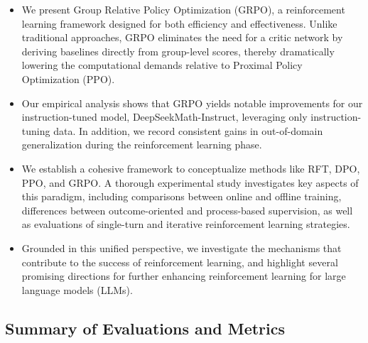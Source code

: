 \begin{itemize}[topsep=0pt]
    \item We present Group Relative Policy Optimization (GRPO), a reinforcement learning framework designed for both efficiency and effectiveness. Unlike traditional approaches, GRPO eliminates the need for a critic network by deriving baselines directly from group-level scores, thereby dramatically lowering the computational demands relative to Proximal Policy Optimization (PPO).
    \item Our empirical analysis shows that GRPO yields notable improvements for our instruction-tuned model, DeepSeekMath-Instruct, leveraging only instruction-tuning data. In addition, we record consistent gains in out-of-domain generalization during the reinforcement learning phase.
    \item We establish a cohesive framework to conceptualize methods like RFT, DPO, PPO, and GRPO. A thorough experimental study investigates key aspects of this paradigm, including comparisons between online and offline training, differences between outcome-oriented and process-based supervision, as well as evaluations of single-turn and iterative reinforcement learning strategies.
    \item Grounded in this unified perspective, we investigate the mechanisms that contribute to the success of reinforcement learning, and highlight several promising directions for further enhancing reinforcement learning for large language models (LLMs).
\end{itemize}

\subsection{Summary of Evaluations and Metrics}

